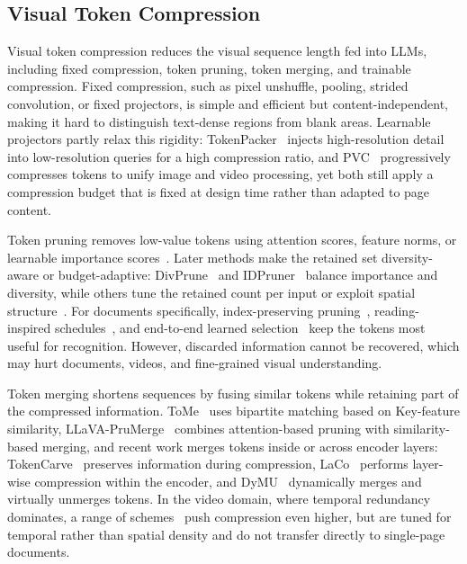 \subsection{Visual Token Compression}

Visual token compression reduces the visual sequence length fed into LLMs, including fixed compression, token pruning, token merging, and trainable compression. Fixed compression, such as pixel unshuffle, pooling, strided convolution, or fixed projectors, is simple and efficient but content-independent, making it hard to distinguish text-dense regions from blank areas. Learnable projectors partly relax this rigidity: TokenPacker~\cite{li2024tokenpacker} injects high-resolution detail into low-resolution queries for a high compression ratio, and PVC~\cite{yang2024pvc} progressively compresses tokens to unify image and video processing, yet both still apply a compression budget that is fixed at design time rather than adapted to page content.

Token pruning removes low-value tokens using attention scores, feature norms, or learnable importance scores~\cite{rao2021dynamicvit,chen2024fastv,visionzip2025,hu2026illava}. Later methods make the retained set diversity-aware or budget-adaptive: DivPrune~\cite{alvar2025divprune} and IDPruner~\cite{idpruner2026} balance importance and diversity, while others tune the retained count per input or exploit spatial structure~\cite{li2026occamtoken,vispco2026,visiontrim2026,gridprune2025,fcot2025}. For documents specifically, index-preserving pruning~\cite{indexpreserving2025}, reading-inspired schedules~\cite{rtprune2026}, and end-to-end learned selection~\cite{zhu2025visionselector} keep the tokens most useful for recognition. However, discarded information cannot be recovered, which may hurt documents, videos, and fine-grained visual understanding.

Token merging shortens sequences by fusing similar tokens while retaining part of the compressed information. ToMe~\cite{bolya2023tome} uses bipartite matching based on Key-feature similarity, LLaVA-PruMerge~\cite{shang2024llavaprumerge} combines attention-based pruning with similarity-based merging, and recent work merges tokens inside or across encoder layers: TokenCarve~\cite{tan2025tokencarve} preserves information during compression, LaCo~\cite{liu2025laco} performs layer-wise compression within the encoder, and DyMU~\cite{wang2025dymu} dynamically merges and virtually unmerges tokens. In the video domain, where temporal redundancy dominates, a range of schemes~\cite{dycoke2025,shao2025holitom,liu2026infomerge,forestprune2026,onetokenperframe2026,unifiedspatiotemporal2026,smallvlmcompressor2026,statefultoken2026} push compression even higher, but are tuned for temporal rather than spatial density and do not transfer directly to single-page documents.

